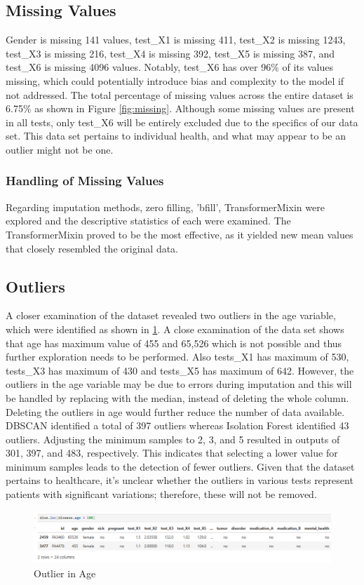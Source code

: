 \documentclass[a4paper]{article}
\begin{document}
\subsection{Missing Values}
Gender is missing 141 values, test\_X1 is missing 411, test\_X2 is missing 1243, test\_X3 is missing 216, test\_X4 is missing 392, test\_X5 is missing 387, and test\_X6 is missing 4096 values. Notably, test\_X6 has over 96\% of its values missing, which could potentially introduce bias and complexity to the model if not addressed. The total percentage of missing values across the entire dataset is 6.75\% as shown in Figure \ref{fig:missing}. Although some missing values are present in all tests, only test\_X6 will be entirely excluded due to the specifics of our data set. This data set pertains to individual health, and what may appear to be an outlier might not be one. 


\subsubsection{Handling of Missing Values}
Regarding imputation methods, zero filling, 'bfill', TransformerMixin were explored and the descriptive statistics of each were examined. The TransformerMixin proved to be the most effective, as it yielded new mean values that closely resembled the original data.
\subsection{Outliers}
A closer examination of the dataset revealed two outliers in the age variable, which were identified as shown in \ref{fig:age}. A close examination of the data set shows that age has maximum value of 455 and 65,526 which is not possible and thus further exploration needs to be performed. Also tests\_X1 has maximum of 530, tests\_X3 has maximum of 430 and tests\_X5 has maximum of 642. However, the outliers in the age variable may be due to errors during imputation and this will be handled by replacing with the median, instead of deleting the whole column. Deleting the outliers in age would further reduce the number of data available.   DBSCAN identified a total of 397 outliers whereas Isolation Forest identified 43 outliers. Adjusting the minimum samples to 2, 3, and 5 resulted in outputs of 301, 397, and 483, respectively. This indicates that selecting a lower value for minimum samples leads to the detection of fewer outliers. Given that the dataset pertains to healthcare, it's unclear whether the outliers in various tests represent patients with significant variations; therefore, these will not be removed. 
\begin{figure}
    \centering
    \includegraphics[width=0.5\linewidth]{age.png}
    \caption{Outlier in Age}
    \label{fig:age}
\end{figure}
\end{document}
